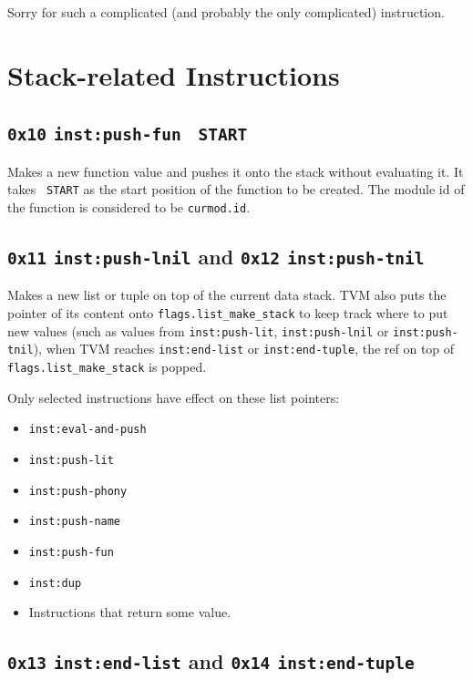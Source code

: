\documentclass{report}
\newcommand{\mtilde}[1]{\textasciitilde}
\newcommand{\marg}[1]{\texttt{\mtilde ~#1}}
\newcommand{\inst}[1] {\texttt{inst:#1}}
\begin{document}
Sorry for such a complicated (and probably the only complicated) instruction.

\section{Stack-related Instructions}

\subsection{\texttt{0x10} \inst{push-fun} \marg{START}}

Makes a new function value and pushes it onto the stack without evaluating it. It takes \marg{START} as the start position of the function to be created. The module id of the function is considered to be \texttt{curmod.id}.

\subsection{\texttt{0x11} \inst{push-lnil} and \texttt{0x12} \inst{push-tnil}}

Makes a new list or tuple on top of the current data stack. TVM also puts the pointer of its content onto \texttt{flags.list\_make\_stack} to keep track where to put new values (such as values from \inst{push-lit}, \inst{push-lnil} or \inst{push-tnil}), when TVM reaches \inst{end-list} or \inst{end-tuple}, the ref on top of \texttt{flags.list\_make\_stack} is popped.

\begin{mdframed}[style=detail]
  Only selected instructions have effect on these list pointers:
  \begin{itemize}
  \item \inst{eval-and-push}
  \item \inst{push-lit}
  \item \inst{push-phony}
  \item \inst{push-name}
  \item \inst{push-fun}
  \item \inst{dup}
  \item Instructions that return some value.
  \end{itemize}
\end{mdframed}

\subsection{\texttt{0x13} \inst{end-list} and \texttt{0x14} \inst{end-tuple}}
\end{document}
